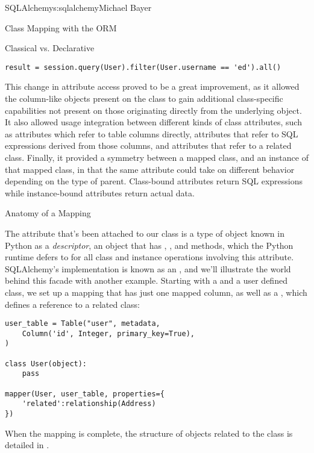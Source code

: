 \begin{aosachapter}{SQLAlchemy}{s:sqlalchemy}{Michael Bayer}
\begin{aosasect1}{Class Mapping with the ORM}
\begin{aosasect2}{Classical vs. Declarative}
\begin{verbatim}
result = session.query(User).filter(User.username == 'ed').all()
\end{verbatim}

This change in attribute access proved to be a great improvement, as it
allowed the column-like objects
present on the class to gain additional class-specific capabilities not
present on those originating directly from the underlying  object. It
also allowed usage integration between different kinds of class attributes,
such as attributes which refer to table columns directly, attributes that
refer to SQL expressions derived from those columns, and attributes that
refer to a related class.  Finally, it provided a symmetry between a mapped
class, and an instance of that mapped class, in that the same attribute
could take on different behavior depending on the type of parent.  Class-bound
attributes return SQL expressions while instance-bound attributes return
actual data.

\end{aosasect2}

\begin{aosasect2}{Anatomy of a Mapping}

The  attribute that's been attached to our  class is a type of
object known in Python as a \emph{descriptor}, an object
that has , , and  methods, which the Python
runtime defers to for all class and instance operations involving this attribute.
SQLAlchemy's implementation is known as an ,
and we'll illustrate the world behind this facade with another example.
Starting with a  and a user defined class, we set up a mapping that has just one
mapped column, as well as a , which defines a reference to a related class:

\begin{verbatim}
user_table = Table("user", metadata,
    Column('id', Integer, primary_key=True),
)

class User(object):
    pass

mapper(User, user_table, properties={
    'related':relationship(Address)
})
\end{verbatim}

When the mapping is complete, the structure of objects related to the class is detailed in .



\end{aosasect2}
\end{aosasect1}
\end{aosachapter}
